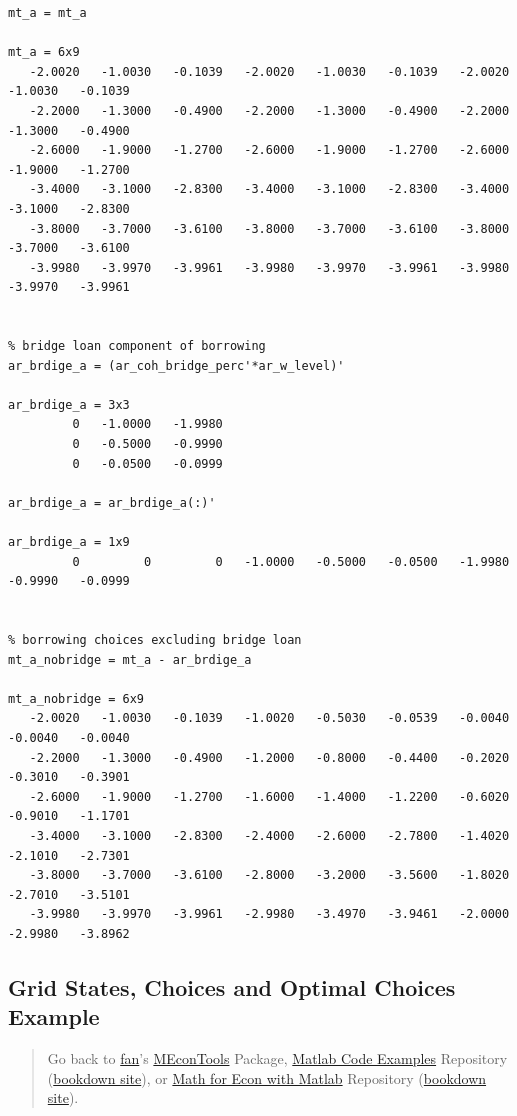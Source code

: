 \documentclass[
]{book}
\begin{document}
\begin{verbatim}
mt_a = mt_a

mt_a = 6x9    
   -2.0020   -1.0030   -0.1039   -2.0020   -1.0030   -0.1039   -2.0020   -1.0030   -0.1039
   -2.2000   -1.3000   -0.4900   -2.2000   -1.3000   -0.4900   -2.2000   -1.3000   -0.4900
   -2.6000   -1.9000   -1.2700   -2.6000   -1.9000   -1.2700   -2.6000   -1.9000   -1.2700
   -3.4000   -3.1000   -2.8300   -3.4000   -3.1000   -2.8300   -3.4000   -3.1000   -2.8300
   -3.8000   -3.7000   -3.6100   -3.8000   -3.7000   -3.6100   -3.8000   -3.7000   -3.6100
   -3.9980   -3.9970   -3.9961   -3.9980   -3.9970   -3.9961   -3.9980   -3.9970   -3.9961


% bridge loan component of borrowing
ar_brdige_a = (ar_coh_bridge_perc'*ar_w_level)'

ar_brdige_a = 3x3    
         0   -1.0000   -1.9980
         0   -0.5000   -0.9990
         0   -0.0500   -0.0999

ar_brdige_a = ar_brdige_a(:)'

ar_brdige_a = 1x9    
         0         0         0   -1.0000   -0.5000   -0.0500   -1.9980   -0.9990   -0.0999


% borrowing choices excluding bridge loan
mt_a_nobridge = mt_a - ar_brdige_a

mt_a_nobridge = 6x9    
   -2.0020   -1.0030   -0.1039   -1.0020   -0.5030   -0.0539   -0.0040   -0.0040   -0.0040
   -2.2000   -1.3000   -0.4900   -1.2000   -0.8000   -0.4400   -0.2020   -0.3010   -0.3901
   -2.6000   -1.9000   -1.2700   -1.6000   -1.4000   -1.2200   -0.6020   -0.9010   -1.1701
   -3.4000   -3.1000   -2.8300   -2.4000   -2.6000   -2.7800   -1.4020   -2.1010   -2.7301
   -3.8000   -3.7000   -3.6100   -2.8000   -3.2000   -3.5600   -1.8020   -2.7010   -3.5101
   -3.9980   -3.9970   -3.9961   -2.9980   -3.4970   -3.9461   -2.0000   -2.9980   -3.8962
\end{verbatim}

\hypertarget{grid-states-choices-and-optimal-choices-example}{%
\subsection{Grid States, Choices and Optimal Choices Example}\label{grid-states-choices-and-optimal-choices-example}}

\begin{quote}
Go back to \href{http://fanwangecon.github.io/}{fan}'s \href{https://fanwangecon.github.io/MEconTools/}{MEconTools} Package, \href{https://fanwangecon.github.io/M4Econ/}{Matlab Code Examples} Repository (\href{https://fanwangecon.github.io/M4Econ/bookdown}{bookdown site}), or \href{https://fanwangecon.github.io/Math4Econ/}{Math for Econ with Matlab} Repository (\href{https://fanwangecon.github.io/Math4Econ/bookdown}{bookdown site}).
\end{quote}
\end{document}
